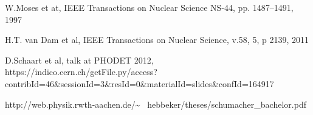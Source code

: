 %
\begin{thebibliography}{99}

   W.Moses et at, IEEE Transactions on Nuclear Science NS-44, pp. 1487–1491, 1997 

  H.T. van Dam et al, IEEE Transactions on Nuclear Science, v.58, 5, p 2139, 2011

  D.Schaart et al, talk at PHODET 2012, \\
  https://indico.cern.ch/getFile.py/access?contribId=46\&sessionId=3\&resId=0\&materialId=slides\&confId=164917

   http://web.physik.rwth-aachen.de/\~ ~hebbeker/theses/schumacher\_bachelor.pdf
\end{thebibliography}
